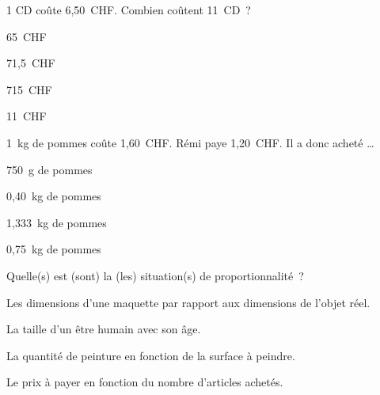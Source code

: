 

\begin{QCM}
  \begin{GroupeQCM}
    \begin{exercice}
     1 CD coûte 6,50 CHF. Combien coûtent 11 CD ?
      \begin{ChoixQCM}{4}
      \item 65 CHF
      \item 71,5 CHF
      \item 715 CHF
      \item 11 CHF
      \end{ChoixQCM}
\begin{corrige}
   \end{corrige}
    \end{exercice}
    
   
    \begin{exercice}
      1 kg de pommes coûte 1,60 CHF. Rémi paye 1,20 CHF. Il a donc acheté \ldots
      \begin{ChoixQCM}{4}
      \item 750 g de pommes
      \item 0,40 kg de pommes
      \item 1,333 kg de pommes
      \item 0,75 kg de pommes
      \end{ChoixQCM}
\begin{corrige}
   \end{corrige}
    \end{exercice}
    
    
    \begin{exercice}
      Quelle(s) est (sont) la (les) situation(s) de proportionnalité ?
      \begin{ChoixQCM}{4}
      \item Les dimensions d'une maquette par rapport aux dimensions de l'objet réel.
      \item La taille d'un être humain avec son âge.
      \item La quantité de peinture en fonction de la surface à peindre.
      \item Le prix à payer en fonction du nombre d'articles achetés.
      \end{ChoixQCM}
\begin{corrige}
   \end{corrige}
    \end{exercice}
    

\end{GroupeQCM}
\end{QCM}

